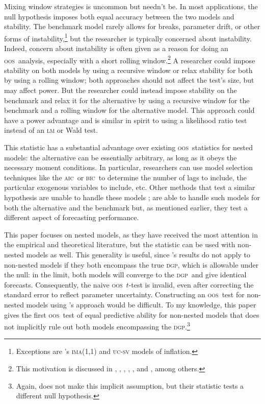 \documentclass[12pt]{article}
\newcommand\citepos[2][]{\citeauthor{#2}'s \citeyearpar[#1]{#2}}
\theoremstyle{definition}
\newcommand{\aic}{\textsc{aic}}
\newcommand{\bic}{\textsc{bic}}
\newcommand{\dgp}{\textsc{dgp}}
\newcommand{\oos}{\textsc{oos}}
\begin{document}
Mixing window strategies is uncommon but needn't be. In most
applications, the null hypothesis imposes both equal accuracy between
the two models and stability.  The benchmark model rarely allows for
breaks, parameter drift, or other forms of
instability,\footnote{Exceptions are \citepos{StW:07}
  \textsc{ima}(1,1) and \textsc{uc-sv} models of inflation.} but the
researcher is typically concerned about instability.  Indeed, concern
about instability is often given as a reason for doing an \oos\
analysis, especially with a short rolling window.\footnote{This
  motivation is discussed in \citet{StW:03}, \citet{PeT:05,PeT:07},
  \cite{GiW:06}, \citet{GoW:08}, \citet{ClM:09c}, and
  \cite{GiR:09,GiR:10}, among others.} A researcher could impose
stability on both models by using a recursive window or relax
stability for both by using a rolling window; both approaches should
not affect the test's size, but may affect power.  But the researcher
could instead impose stability on the benchmark and relax it for the
alternative by using a recursive window for the benchmark and a
rolling window for the alternative model.  This approach could have a
power advantage and is similar in spirit to using a likelihood ratio
test instead of an \textsc{lm} or Wald test.

This statistic has a substantial advantage over existing \oos\
statistics for nested models: the alternative can be essentially
arbitrary, as long as it obeys the necessary moment conditions.  In
particular, researchers can use model selection techniques like the
\aic\ or \bic\ to determine the number of lags to include, the
particular exogenous variables to include, etc.  Other methods that
test a similar hypothesis are unable to handle these models
\citep[except][which does not allow the benchmark to be
estimated]{ClW:06}; \citet{GiW:06} are able to handle such models for
both the alternative and the benchmark but, as mentioned earlier, they
test a different aspect of forecasting performance.

This paper focuses on nested models, as they have received the most
attention in the empirical and theoretical literature, but the
statistic can be used with non-nested models as well.  This generality
is useful, since \citepos{Wes:96} results do not apply to non-nested
models if they both encompass the true \dgp, which is allowable under
the null: in the limit, both models will converge to the \dgp\ and
give identical forecasts.  Consequently, the naive \oos\ $t$-test is
invalid, even after correcting the standard error to reflect parameter
uncertainty.  Constructing an \oos\ test for non-nested models using
\citepos{ClM:01} approach would be difficult.  To my knowledge, this
paper gives the first \oos\ test of equal predictive ability for
non-nested models that does not implicitly rule out both models
encompassing the \dgp.\footnote{Again, \citet{GiW:06} does not make
  this implicit assumption, but their statistic tests a different null
  hypothesis.}
\end{document}
